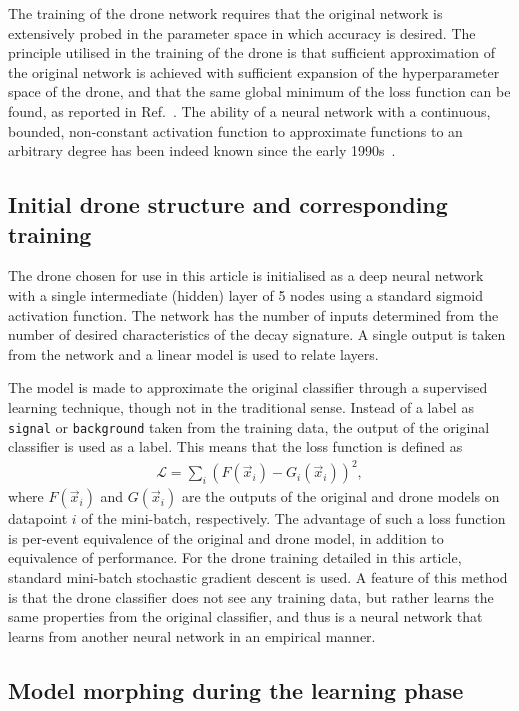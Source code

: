 \documentclass[final,5p,times,twocolumn]{elsarticle}
\begin{document}
The training of the drone network requires that the original network is
extensively probed in the parameter space in which accuracy is desired.
The principle utilised in the training of the drone is that sufficient
approximation of the original network is achieved with sufficient expansion
of the hyperparameter space of the drone, and that the same global minimum
of the loss function can be found, as reported in Ref.~\cite{losssurfaces}.
The ability of a neural network with a continuous, bounded, non-constant activation
function to approximate functions to an arbitrary degree has been indeed known
since the early 1990s~\cite{HORNIK1991251}.

\subsection{Initial drone structure and corresponding training}

The drone chosen for use in this article is initialised as a
deep neural network with a single intermediate (hidden) layer of 5
nodes using a standard sigmoid activation function. The network
has the number of inputs determined from the number of desired
characteristics of the decay signature. A single output is taken
from the network and a linear model is used to relate layers.

The model is made to approximate the original classifier through
a supervised learning technique, though not in the traditional sense.
Instead of a label as {\tt signal} or {\tt background} taken from the training data, the
output of the original classifier is used as a label. This means that the
loss function is defined as
\begin{align}
\mathcal{L} = \sum_i \left( F(\vec{x}_i) - G_i(\vec{x}_i) \right)^2,
\end{align}
where $F(\vec{x}_i)$ and $G(\vec{x}_i)$ are the outputs
of the original and drone models on datapoint
$i$ of the mini-batch, respectively. The advantage of such a loss function is per-event
equivalence of the original and drone model, in addition to equivalence
of performance. For the drone training detailed in this article, standard
mini-batch stochastic gradient descent is used. A feature of this method
is that the drone classifier does not see any training data,
but rather learns the same properties from the original classifier,
and thus is a neural network that learns from another neural network in an
empirical manner.

\subsection{Model morphing during the learning phase}
\end{document}
